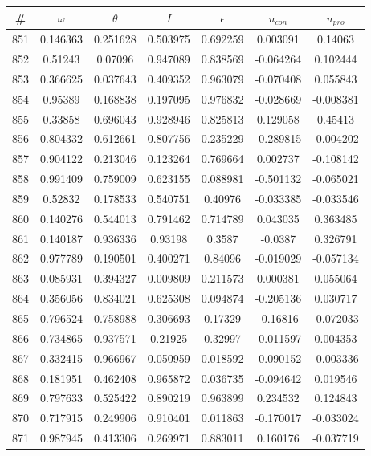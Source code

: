 \begin{table}
\begin{tabular}{c|c|c|c|c|c|c}
\# & $\omega$ & $\theta$ & $I$ & $\epsilon$ & $u_{con}$ & $u_{pro}$\\
\hline
851 & 0.146363 & 0.251628 & 0.503975 & 0.692259 & 0.003091 & 0.14063\\
852 & 0.51243 & 0.07096 & 0.947089 & 0.838569 & -0.064264 & 0.102444\\
853 & 0.366625 & 0.037643 & 0.409352 & 0.963079 & -0.070408 & 0.055843\\
854 & 0.95389 & 0.168838 & 0.197095 & 0.976832 & -0.028669 & -0.008381\\
855 & 0.33858 & 0.696043 & 0.928946 & 0.825813 & 0.129058 & 0.45413\\
856 & 0.804332 & 0.612661 & 0.807756 & 0.235229 & -0.289815 & -0.004202\\
857 & 0.904122 & 0.213046 & 0.123264 & 0.769664 & 0.002737 & -0.108142\\
858 & 0.991409 & 0.759009 & 0.623155 & 0.088981 & -0.501132 & -0.065021\\
859 & 0.52832 & 0.178533 & 0.540751 & 0.40976 & -0.033385 & -0.033546\\
860 & 0.140276 & 0.544013 & 0.791462 & 0.714789 & 0.043035 & 0.363485\\
861 & 0.140187 & 0.936336 & 0.93198 & 0.3587 & -0.0387 & 0.326791\\
862 & 0.977789 & 0.190501 & 0.400271 & 0.84096 & -0.019029 & -0.057134\\
863 & 0.085931 & 0.394327 & 0.009809 & 0.211573 & 0.000381 & 0.055064\\
864 & 0.356056 & 0.834021 & 0.625308 & 0.094874 & -0.205136 & 0.030717\\
865 & 0.796524 & 0.758988 & 0.306693 & 0.17329 & -0.16816 & -0.072033\\
866 & 0.734865 & 0.937571 & 0.21925 & 0.32997 & -0.011597 & 0.004353\\
867 & 0.332415 & 0.966967 & 0.050959 & 0.018592 & -0.090152 & -0.003336\\
868 & 0.181951 & 0.462408 & 0.965872 & 0.036735 & -0.094642 & 0.019546\\
869 & 0.797633 & 0.525422 & 0.890219 & 0.963899 & 0.234532 & 0.124843\\
870 & 0.717915 & 0.249906 & 0.910401 & 0.011863 & -0.170017 & -0.033024\\
871 & 0.987945 & 0.413306 & 0.269971 & 0.883011 & 0.160176 & -0.037719\\

\end{tabular}
\end{table}
